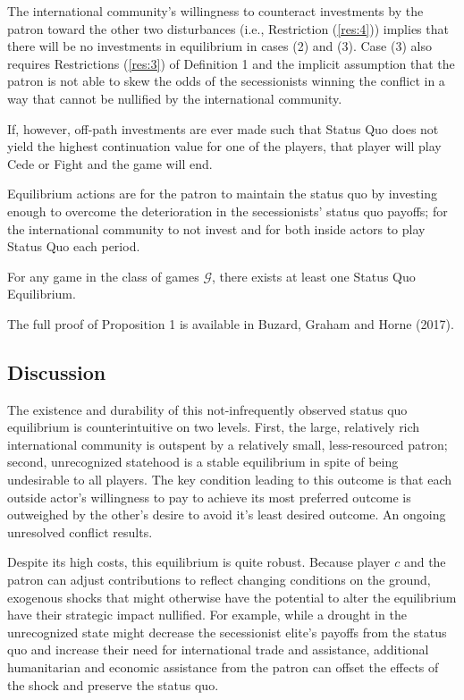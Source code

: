 The international community's willingness to counteract investments by the patron toward the other two disturbances (i.e., Restriction (\ref{res:4})) implies that there will be no investments in equilibrium in cases (2) and (3). Case (3) also requires Restrictions (\ref{res:3}) of Definition 1 and the implicit assumption that the patron is not able to skew the odds of the secessionists winning the conflict in a way that cannot be nullified by the international community. 

If, however, off-path investments are ever made such that Status Quo does not yield the highest continuation value for one of the players, that player will play Cede or Fight and the game will end.

Equilibrium actions are for the patron to maintain the status quo by investing enough to overcome the deterioration in the secessionists' status quo payoffs; for the international community to not invest and for both inside actors to play Status Quo each period.

\begin{proposition}
	For any game in the class of games $\mathcal{G}$, there exists at least one Status Quo Equilibrium.
\end{proposition}

The full proof of Proposition 1 is available in Buzard, Graham and Horne (2017).


\subsection{Discussion}

The existence and durability of this not-infrequently observed status quo equilibrium is counterintuitive on two levels. First, the large, relatively rich international community is outspent by a relatively small, less-resourced patron; second, unrecognized statehood is a stable equilibrium in spite of being undesirable to all players. The key condition leading to this outcome is that each outside actor's willingness to pay to achieve its most preferred outcome is outweighed by the other's desire to avoid it's least desired outcome. An ongoing unresolved conflict results.

Despite its high costs, this equilibrium is quite robust. Because player $c$ and the patron can adjust contributions to reflect changing conditions on the ground, exogenous shocks that might otherwise have the potential to alter the equilibrium have their strategic impact nullified. For example, while a drought in the unrecognized state might decrease the secessionist elite's payoffs from the status quo and increase their need for international trade and assistance, additional humanitarian and economic assistance from the patron can offset the effects of the shock and preserve the status quo.

